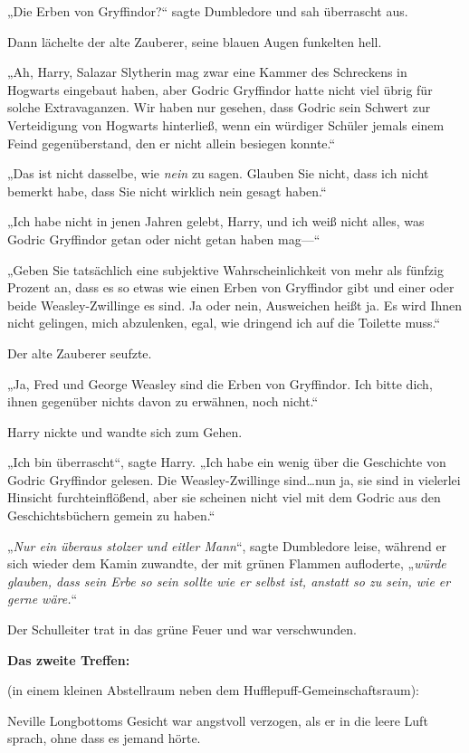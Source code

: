 {„Die Erben von Gryffindor?“ sagte Dumbledore und sah überrascht aus.

Dann lächelte der alte Zauberer, seine blauen Augen funkelten hell.

„Ah, Harry, Salazar Slytherin mag zwar eine Kammer des Schreckens in Hogwarts eingebaut haben, aber Godric Gryffindor hatte nicht viel übrig für solche Extravaganzen. Wir haben nur gesehen, dass Godric sein Schwert zur Verteidigung von Hogwarts hinterließ, wenn ein würdiger Schüler jemals einem Feind gegenüberstand, den er nicht allein besiegen konnte.“

„Das ist nicht dasselbe, wie \emph{nein} zu sagen. Glauben Sie nicht, dass ich nicht bemerkt habe, dass Sie nicht wirklich nein gesagt haben.“

„Ich habe nicht in jenen Jahren gelebt, Harry, und ich weiß nicht alles, was Godric Gryffindor getan oder nicht getan haben mag—“

„Geben Sie tatsächlich eine subjektive Wahrscheinlichkeit von mehr als fünfzig Prozent an, dass es so etwas wie einen Erben von Gryffindor gibt und einer oder beide Weasley-Zwillinge es sind. Ja oder nein, Ausweichen heißt ja. Es wird Ihnen nicht gelingen, mich abzulenken, egal, wie dringend ich auf die Toilette muss.“

Der alte Zauberer seufzte.

„Ja, Fred und George Weasley sind die Erben von Gryffindor. Ich bitte dich, ihnen gegenüber nichts davon zu erwähnen, noch nicht.“

Harry nickte und wandte sich zum Gehen.

„Ich bin überrascht“, sagte Harry. „Ich habe ein wenig über die Geschichte von Godric Gryffindor gelesen. Die Weasley-Zwillinge sind…nun ja, sie sind in vielerlei Hinsicht furchteinflößend, aber sie scheinen nicht viel mit dem Godric aus den Geschichtsbüchern gemein zu haben.“

„\emph{Nur ein überaus stolzer und eitler Mann}“, sagte Dumbledore leise, während er sich wieder dem Kamin zuwandte, der mit grünen Flammen aufloderte, „\emph{würde glauben, dass sein Erbe so sein sollte wie er selbst ist, anstatt so zu sein, wie er gerne wäre.}“

Der Schulleiter trat in das grüne Feuer und war verschwunden.

\textbf{Das zweite Treffen:}

(in einem kleinen Abstellraum neben dem Hufflepuff-Gemeinschaftsraum):

Neville Longbottoms Gesicht war angstvoll verzogen, als er in die leere Luft sprach, ohne dass es jemand hörte.

}
